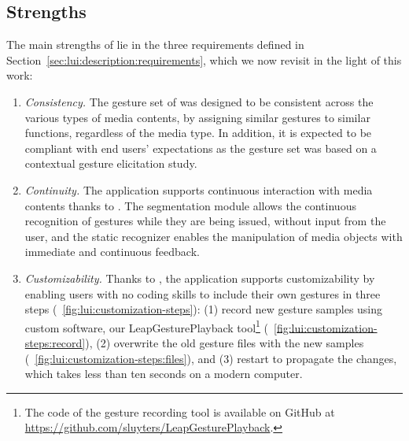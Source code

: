 \subsection{Strengths} \label{sec:lui:discussion:strengths}
The main strengths of \lui lie in the three requirements defined in Section~\ref{sec:lui:description:requirements}, which we now revisit in the light of this work:
%
\begin{enumerate}
    \item \textit{Consistency.} The gesture set of \lui was designed to be consistent across the various types of media contents, by assigning similar gestures to similar functions, regardless of the media type. In addition, it is expected to be compliant with end users' expectations as the gesture set was based on a contextual gesture elicitation study.
    \item \textit{Continuity.} The \lui application supports continuous interaction with media contents thanks to \ql. The segmentation module allows the continuous recognition of gestures while they are being issued, without input from the user, and the static recognizer enables the manipulation of media objects with immediate and continuous feedback.
    \item \textit{Customizability.} Thanks to \ql, the \lui application supports customizability by enabling users with no coding skills to include their own gestures in three steps (\fig~\ref{fig:lui:customization-steps}): (1) record new gesture samples using custom software, \eg our LeapGesturePlayback tool\footnote{The code of the gesture recording tool is available on GitHub at \url{https://github.com/sluyters/LeapGesturePlayback}.} (\fig~\ref{fig:lui:customization-steps:record}), (2) overwrite the old gesture files with the new samples (\fig~\ref{fig:lui:customization-steps:files}), and (3) restart \ql to propagate the changes, which takes less than ten seconds on a modern computer.
\end{enumerate}

